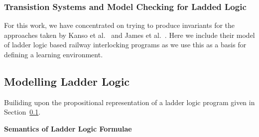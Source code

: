 \documentclass[conference,compsoc]{IEEEtran}
\begin{document}
\subsubsection{Transistion Systems and Model Checking for Ladded Logic}
For this work, we have concentrated on trying to produce invariants for the approaches taken by Kanso et al.~\cite{kanso2009automated} and James et al.~\cite{james2013verification}. Here we include their model of ladder logic based railway interlocking programs as we use this as a basis for defining a learning environment. 
\subsection{Modelling Ladder Logic}
Builiding upon the propositional representation of a ladder logic program given in Section~\ref{}.

\textbf{Semantics of Ladder Logic Formulae}

\end{document}
